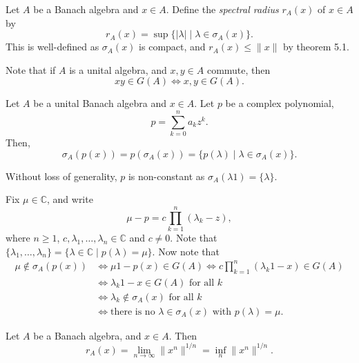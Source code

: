 \documentclass[12pt]{article}
\begin{document}
\begin{definition}
	Let $A$ be a Banach algebra and $x \in A$. Define the \emph{spectral radius} $r_A(x)$ of $x \in A$ by
	\[
	r_A(x) = \sup \{ |\lambda| \mid \lambda \in \sigma_A(x)\}.
	\]
	This is well-defined as $\sigma_A(x)$ is compact, and $r_A(x) \leq \|x\|$ by theorem 5.1.
\end{definition}

Note that if $A$ is a unital algebra, and $x, y \in A$ commute, then
\[
xy \in G(A) \iff x, y \in G(A).
\]

\begin{lemma}
	Let $A$ be a unital Banach algebra and $x \in A$. Let $p$ be a complex polynomial,
	\[
	p = \sum_{k = 0}^n a_k z^k.
	\]
	Then,
	\[
		\sigma_A(p(x)) = p(\sigma_A(x)) = \{p(\lambda) \mid \lambda \in \sigma_A(x)\}.
	\]
\end{lemma}

\begin{proofbox}
	Without loss of generality, $p$ is non-constant as $\sigma_A(\lambda 1) = \{\lambda\}$.

	Fix $\mu \in \mathbb{C}$, and write
	\[
	\mu - p = c \prod_{k = 1}^n (\lambda_k - z),
	\]
	where $n \geq 1$, $c, \lambda_1, \ldots, \lambda_n \in \mathbb{C}$ and $c \neq 0$. Note that $\{\lambda_1, \ldots, \lambda_n\} = \{\lambda \in \mathbb{C} \mid p(\lambda) = \mu\}$. Now note that
	\begin{align*}
		\mu \not \in \sigma_A(p(x)) &\iff \mu1 - p(x) \in G(A) \iff c \prod_{k = 1}^n (\lambda_k 1 - x) \in G(A) \\
					    &\iff \lambda_k 1 - x \in G(A) \text{ for all } k \\
					    &\iff \lambda_k \not \in\sigma_A(x) \text{ for all } k \\
					    &\iff \text{there is no } \lambda \in \sigma_A(x) \text{ with } p(\lambda) = \mu.
	\end{align*}
\end{proofbox}

\begin{theorem}
	Let $A$ be a Banach algebra, and $x \in A$. Then
	\[
	r_A(x) = \lim_{n \to \infty} \|x^{n}\|^{1/n} = \inf_n \|x^{n}\|^{1/n}.
	\]
\end{theorem}
\end{document}
